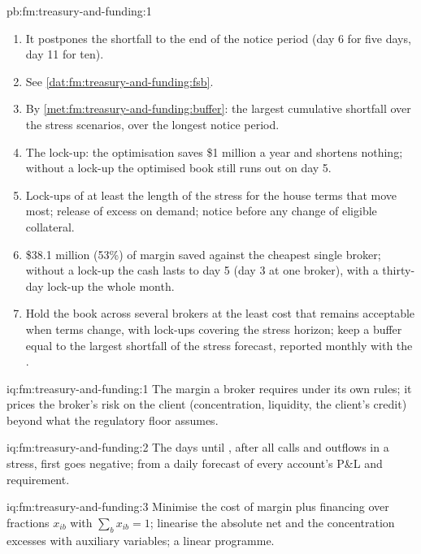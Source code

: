 \begin{solution}{pb:fm:treasury-and-funding:1}
\begin{enumerate}
\item It postpones the shortfall to the end of the notice period (day 6 for five days, day 11 for ten).
\item See \cref{dat:fm:treasury-and-funding:fsb}.
\item By \cref{met:fm:treasury-and-funding:buffer}: the largest cumulative shortfall over the stress scenarios, over the longest notice period.
\item The lock-up: the optimisation saves \$1 million a year and shortens nothing; without a lock-up the optimised book still runs out on day 5.
\item Lock-ups of at least the length of the stress for the house terms that move most; release of excess on demand; notice before any change
of eligible collateral.
\item \$38.1 million (53\%) of margin saved against the cheapest single broker; without a lock-up the cash lasts to day 5 (day 3 at one broker),
with a thirty-day lock-up the whole month.
\item Hold the book across several brokers at the least cost that remains acceptable when terms change, with lock-ups covering the stress horizon;
keep a buffer equal to the largest shortfall of the stress forecast, reported monthly with the .
\end{enumerate}
\end{solution}

\begin{solution}{iq:fm:treasury-and-funding:1}
The margin a broker requires under its own rules; it prices the broker's risk on the client (concentration, liquidity, the client's credit) beyond
what the regulatory floor assumes.
\end{solution}

\begin{solution}{iq:fm:treasury-and-funding:2}
The days until , after all calls and outflows in a stress, first goes negative; from a daily forecast of every account's P\&L and
requirement.
\end{solution}

\begin{solution}{iq:fm:treasury-and-funding:3}
Minimise the cost of margin plus financing over fractions $x_{ib}$ with $\sum_bx_{ib}=1$; linearise the absolute net and the concentration excesses
with auxiliary variables; a linear programme.
\end{solution}

